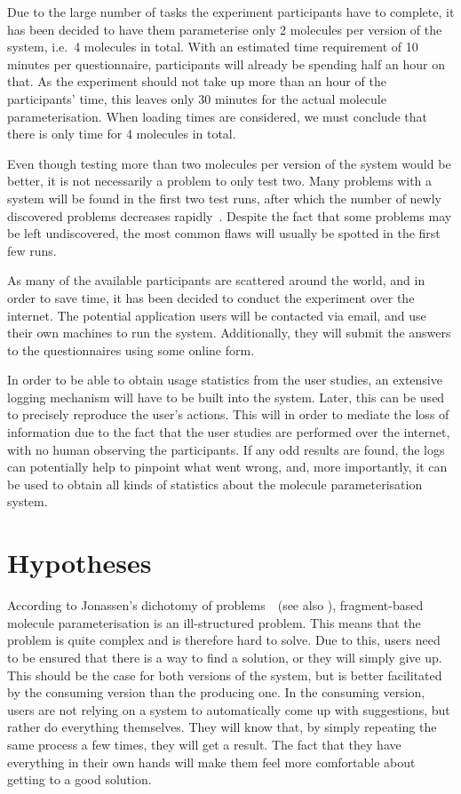 Due to the large number of tasks the experiment participants have to complete, it has been decided to have them parameterise only 2 molecules per version of the system, i.e.\ 4 molecules in total. With an estimated time requirement of 10 minutes per questionnaire, participants will already be spending half an hour on that. As the experiment should not take up more than an hour of the participants' time, this leaves only 30 minutes for the actual molecule parameterisation. When loading times are considered, we must conclude that there is only time for 4 molecules in total.

Even though testing more than two molecules per version of the system would be better, it is not necessarily a problem to only test two. Many problems with a system will be found in the first two test runs, after which the number of newly discovered problems decreases rapidly~\cite{krug2006dont, nielsen2000you}. Despite the fact that some problems may be left undiscovered, the most common flaws will usually be spotted in the first few runs.

As many of the available participants are scattered around the world, and in order to save time, it has been decided to conduct the experiment over the internet. The potential application users will be contacted via email, and use their own machines to run the system. Additionally, they will submit the answers to the questionnaires using some online form.

In order to be able to obtain usage statistics from the user studies, an extensive logging mechanism will have to be built into the system. Later, this can be used to precisely reproduce the user's actions. This will in order to mediate the loss of information due to the fact that the user studies are performed over the internet, with no human observing the participants. If any odd results are found, the logs can potentially help to pinpoint what went wrong, and, more importantly, it can be used to obtain all kinds of statistics about the molecule parameterisation system.



\section{Hypotheses}
According to Jonassen's dichotomy of problems~\cite{jonassen2000toward}~(see also ), fragment-based molecule parameterisation is an ill-structured problem. This means that the problem is quite complex and is therefore hard to solve. Due to this, users need to be ensured that there is a way to find a solution, or they will simply give up. This should be the case for both versions of the system, but is better facilitated by the consuming version than the producing one. In the consuming version, users are not relying on a system to automatically come up with suggestions, but rather do everything themselves. They will know that, by simply repeating the same process a few times, they will get a result. The fact that they have everything in their own hands will make them feel more comfortable about getting to a good solution.

